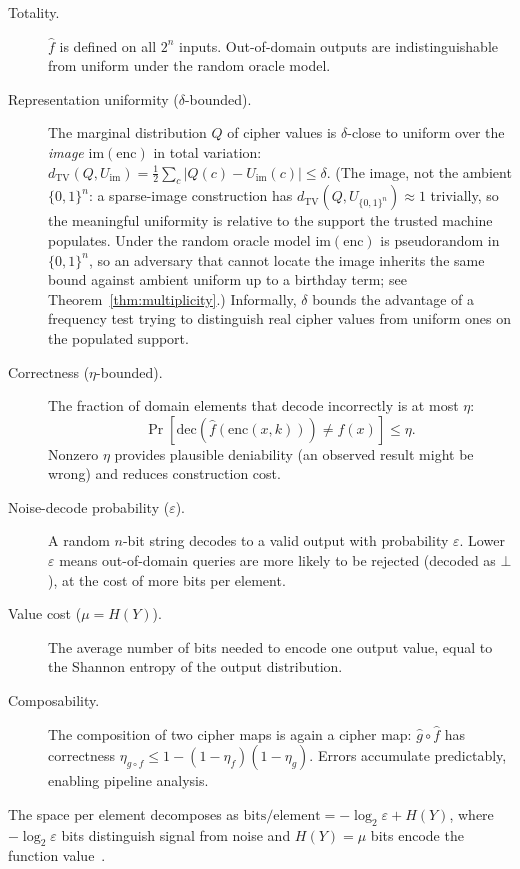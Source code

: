 \documentclass[11pt]{article}
\theoremstyle{definition}
\theoremstyle{plain}
\theoremstyle{remark}
\newcommand{\fhat}{\hat{f}}
\newcommand{\ghat}{\hat{g}}
\newcommand{\enc}{\mathrm{enc}}
\newcommand{\dec}{\mathrm{dec}}
\newcommand{\TV}{d_{\mathrm{TV}}}
\newcommand{\B}{\{0,1\}}
\begin{document}
\begin{description}
\item[Totality.]  $\fhat$ is defined on all $2^n$ inputs.  Out-of-domain
  outputs are indistinguishable from uniform under the random oracle
  model.

\item[Representation uniformity ($\delta$-bounded).]  The marginal
  distribution $Q$ of cipher values is $\delta$-close to uniform over the
  \emph{image} $\mathrm{im}(\enc)$ in total variation:
  $\TV(Q, U_{\mathrm{im}}) = \frac{1}{2}\sum_c |Q(c) - U_{\mathrm{im}}(c)|
  \leq \delta$.  (The image, not the ambient $\B^n$: a sparse-image
  construction has $\TV(Q, U_{\B^n}) \approx 1$ trivially, so the
  meaningful uniformity is relative to the support the trusted machine
  populates.  Under the random oracle model $\mathrm{im}(\enc)$ is
  pseudorandom in $\B^n$, so an adversary that cannot locate the image
  inherits the same bound against ambient uniform up to a birthday term;
  see Theorem~\ref{thm:multiplicity}.)  Informally, $\delta$ bounds the
  advantage of a frequency test trying to distinguish real cipher values
  from uniform ones on the populated support.

\item[Correctness ($\eta$-bounded).]  The fraction of domain elements
  that decode incorrectly is at most $\eta$:
  \[
  \Pr[\dec(\fhat(\enc(x,k))) \neq f(x)] \leq \eta.
  \]
  Nonzero $\eta$ provides plausible deniability (an observed result might
  be wrong) and reduces construction cost.

\item[Noise-decode probability ($\varepsilon$).]  A random $n$-bit
  string decodes to a valid output with probability $\varepsilon$.
  Lower $\varepsilon$ means out-of-domain queries are more likely to be
  rejected (decoded as $\bot$), at the cost of more bits per element.

\item[Value cost ($\mu = H(Y)$).]  The average number of bits needed to
  encode one output value, equal to the Shannon entropy of the output
  distribution.

\item[Composability.]  The composition of two cipher maps is again a
  cipher map: $\ghat \circ \fhat$ has correctness
  $\eta_{g \circ f} \leq 1 - (1 - \eta_f)(1 - \eta_g)$.
  Errors accumulate predictably, enabling pipeline analysis.
\end{description}

The space per element decomposes as
$\text{bits/element} = -\log_2 \varepsilon + H(Y)$, where
$-\log_2 \varepsilon$ bits distinguish signal from noise and
$H(Y) = \mu$ bits encode the function
value~\cite[Thm.~6.1]{towell2026cipher}.
\end{document}
